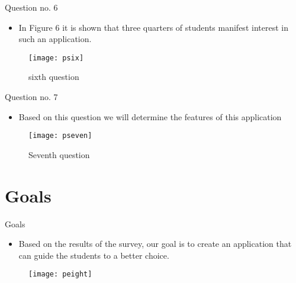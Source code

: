 \documentclass{beamer}
\begin{document}

\begin{frame}{Question no. 6}
	
	\begin{itemize}
		\item In Figure 6 it is shown that three quarters of students manifest interest in such an application.
	\end{itemize}
	
	\begin{figure}[t]
		\texttt{[image: psix]}
		\centering
		\caption{sixth question}
	\end{figure}
\end{frame}


\begin{frame}{Question no. 7}
	
	\begin{itemize}
		\item Based on this question we will determine the features of this application
	\end{itemize}
	
	\begin{figure}[t]
		\texttt{[image: pseven]}
		\centering
		\caption{Seventh question}
	\end{figure}
\end{frame}


\section{Goals}

\begin{frame}{Goals}
	
	\begin{itemize}
		\item Based on the results of the survey, our goal is to create an application that can guide the students to a better choice.
	\end{itemize}

	\begin{figure}[t]
		\texttt{[image: peight]}
		\centering
	\end{figure}
	
\end{frame}

\end{document}
